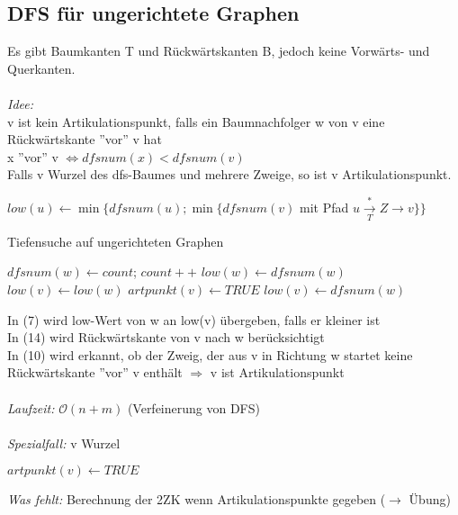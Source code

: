         \subsection{DFS für ungerichtete Graphen}
        	Es gibt Baumkanten T und Rückwärtskanten B, jedoch keine Vorwärts- und Querkanten.\\\\
        	\emph{Idee:}\\
        		v ist kein Artikulationspunkt, falls ein Baumnachfolger w von v eine Rückwärtskante ''vor'' v hat\\
        		x ''vor'' v $\Leftrightarrow dfsnum(x)<dfsnum(v)$\\
        		Falls v Wurzel des dfs-Baumes und mehrere Zweige, so ist v Artikulationspunkt.
        	\begin{definition}
        		$low(u)\gets \min\{dfsnum(u);\min\{dfsnum(v)$ mit Pfad $u\overset{*}{\underset{T}{\rightarrow}}Z\rightarrow v\}\}$
        	\end{definition}
        	\begin{algorithm}
        		\caption{Tiefensuche auf ungerichteten Graphen}
        		\begin{algorithmic}[1]
        						\State $dfsnum(w)\gets count$; $count++$
        						\State $low(w)\gets dfsnum(w)$
        							\State $low(v)\gets low(w)$
        						\EndIf
        							\State $artpunkt(v)\gets TRUE$
        						\EndIf
        					\Else
        							\State $low(v)\gets dfsnum(w)$
        						\EndIf
        					\EndIf
        				\EndFor
        			\EndFunction
        		\end{algorithmic}
        	\end{algorithm}
        	In (7) wird low-Wert von w an low(v) übergeben, falls er kleiner ist\\
        	In (14) wird Rückwärtskante von v nach w berücksichtigt\\
        	In (10) wird erkannt, ob der Zweig, der aus v in Richtung w startet keine Rückwärtskante ''vor'' v enthält $\Rightarrow$ v ist Artikulationspunkt\\\\
        	\emph{Laufzeit:} $\mathcal{O}(n+m)$ (Verfeinerung von DFS)\\\\
        	\emph{Spezialfall:} v Wurzel
        	\begin{algorithmic}
	        		\State $artpunkt(v)\gets TRUE$
	        	\EndIf
        	\end{algorithmic}
        	\emph{Was fehlt:} Berechnung der 2ZK wenn Artikulationspunkte gegeben ($\rightarrow$ Übung)
        	

